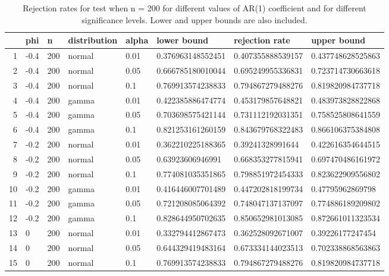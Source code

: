 \begin{table}[ht]
\centering
\caption{Rejection rates for test when n = 200 for 
                   different values of AR(1) coefficient and for different 
                   significance levels. Lower and upper bounds are also 
                   included.} 
\label{table:rr_200}
\begin{tabular}{rlllllll}
  \hline
 & phi & n & distribution & alpha & lower bound & rejection rate & upper bound \\ 
  \hline
1 & -0.4 & 200 & normal & 0.01 & 0.376963148552451 & 0.407355888539157 & 0.437748628525863 \\ 
  2 & -0.4 & 200 & normal & 0.05 & 0.666785180010044 & 0.695249955336831 & 0.723714730663618 \\ 
  3 & -0.4 & 200 & normal & 0.1 & 0.769913574238833 & 0.794867279488276 & 0.819820984737718 \\ 
  4 & -0.4 & 200 & gamma & 0.01 & 0.422385886474774 & 0.453179857648821 & 0.483973828822868 \\ 
  5 & -0.4 & 200 & gamma & 0.05 & 0.703698575421144 & 0.731112192031351 & 0.758525808641559 \\ 
  6 & -0.4 & 200 & gamma & 0.1 & 0.821253161260159 & 0.843679768322483 & 0.866106375384808 \\ 
  7 & -0.2 & 200 & normal & 0.01 & 0.362210225188365 & 0.39241328991644 & 0.422616354644515 \\ 
  8 & -0.2 & 200 & normal & 0.05 & 0.63923606946991 & 0.668353277815941 & 0.697470486161972 \\ 
  9 & -0.2 & 200 & normal & 0.1 & 0.774081035351865 & 0.798851972454333 & 0.823622909556802 \\ 
  10 & -0.2 & 200 & gamma & 0.01 & 0.416446007701489 & 0.447202818199734 & 0.47795962869798 \\ 
  11 & -0.2 & 200 & gamma & 0.05 & 0.721208085064392 & 0.748047137137097 & 0.774886189209802 \\ 
  12 & -0.2 & 200 & gamma & 0.1 & 0.828644950702635 & 0.850652981013085 & 0.872661011323534 \\ 
  13 & 0 & 200 & normal & 0.01 & 0.332794412867473 & 0.362528092671007 & 0.39226177247454 \\ 
  14 & 0 & 200 & normal & 0.05 & 0.644329419483164 & 0.673334144023513 & 0.702338868563863 \\ 
  15 & 0 & 200 & normal & 0.1 & 0.769913574238833 & 0.794867279488276 & 0.819820984737718 \\ 

\end{tabular}
\end{table}
